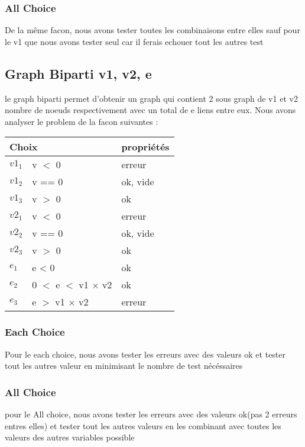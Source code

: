 \documentclass[11pt]{article}
\begin{document}
\subsubsection{All Choice}
De la même facon, nous avons tester toutes les combinaisons entre elles sauf pour le v1 que nous avons tester seul car il ferais echouer tout les autres test
\subsection{Graph Biparti v1, v2, e}
le graph biparti permet d'obtenir un graph qui contient 2 sous graph de v1 et v2 nombre de noeuds respectivement avec un total de e liens entre eux.
Nous avons analyser le problem de la facon suivantes :
\begin{tabular}{|l|l|l|}
 \hline
 \multicolumn{2}{|l|}{Choix} & propriétés                            \\ \hline
 ${v1}_1$                    & v $<$ 0                    & erreur   \\ \hline
 ${v1}_2$                    & v == 0                     & ok, vide \\ \hline
 ${v1}_3$                    & v $>$ 0                    & ok       \\ \hline \hline
 ${v2}_1$                    & v $<$ 0                    & erreur   \\ \hline
 ${v2}_2$                    & v == 0                     & ok, vide \\ \hline
 ${v2}_3$                    & v $>$ 0                    & ok       \\ \hline \hline
 $e_1$                       & e < 0                      & ok       \\ \hline
 $e_2$                       & 0 $<$ e $<$ v1 $\times$ v2 & ok       \\ \hline
 $e_3$                       & e $>$ v1 $\times$ v2       & erreur   \\ \hline
\end{tabular}
\subsubsection{Each Choice}
Pour le each choice, nous avons tester les erreurs avec des valeurs ok et tester tout les autres valeur en minimisant le nombre de test nécéssaires
\subsubsection{All Choice}
pour le All choice, nous avons tester les erreurs avec des valeurs ok(pas 2 erreurs entres elles) et tester tout les autres valeurs en les combinant avec toutes les valeurs des autres variables possible
\end{document}
